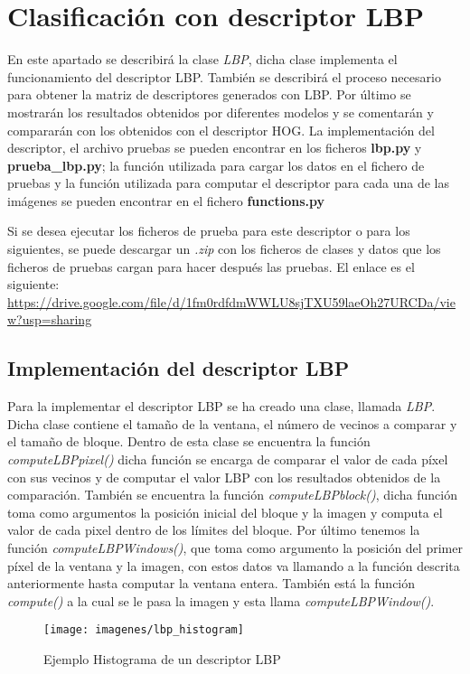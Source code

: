 \chapter{Clasificación con descriptor LBP}
En este apartado se describirá la clase \textit{LBP}, dicha clase implementa el funcionamiento del descriptor LBP. También se describirá el proceso necesario para obtener la matriz de descriptores generados con LBP. Por último se mostrarán los resultados obtenidos por diferentes modelos y se comentarán y compararán con los obtenidos con el descriptor HOG. La implementación del descriptor, el archivo pruebas se pueden encontrar en los ficheros \textbf{lbp.py} y \textbf{prueba\_lbp.py}; la función utilizada para cargar los datos en el fichero de pruebas y la función utilizada para computar el descriptor para cada una de las imágenes se pueden encontrar en el fichero \textbf{functions.py}

Si se desea ejecutar los ficheros de prueba para este descriptor o para los siguientes, se puede descargar un \textit{.zip} con los ficheros de clases y datos que los ficheros de pruebas cargan para hacer después las pruebas. El enlace es el siguiente: \url{https://drive.google.com/file/d/1fm0rdfdmWWLU8sjTXU59laeOh27URCDa/view?usp=sharing}

\section{Implementación del descriptor LBP}
Para la implementar el descriptor LBP se ha creado una clase, llamada \textit{LBP}. Dicha clase contiene el tamaño de la ventana, el número de vecinos a comparar y el tamaño de bloque. Dentro de esta clase se encuentra la función \textit{computeLBPpixel()} dicha función se encarga de comparar el valor de cada píxel con sus vecinos y de computar el valor LBP con los resultados obtenidos de la comparación. También se encuentra la función \textit{computeLBPblock()}, dicha función toma como argumentos la posición inicial del bloque y la imagen y computa el valor de cada pixel dentro de los límites del bloque. Por último tenemos la función \textit{computeLBPWindows()}, que toma como argumento la posición del primer píxel de la ventana y la imagen, con estos datos va llamando a la función descrita anteriormente hasta computar la ventana entera. También está la función \textit{compute()} a la cual se le pasa la imagen y esta llama \textit{computeLBPWindow()}. \\

\begin{figure}[H]
	\centering
	\texttt{[image: imagenes/lbp\_histogram]}
	\caption{Ejemplo Histograma de un descriptor LBP}
	\label{fig:salida_3}
\end{figure}

